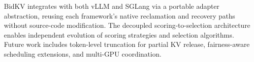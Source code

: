 \documentclass[sigconf,nonacm]{acmart}
\newcommand{\bidkv}{BidKV\xspace}
\begin{document}
\bidkv integrates with both vLLM and SGLang via a portable adapter
abstraction, reusing each framework's native reclamation and recovery paths
without source-code modification.  The decoupled scoring-to-selection architecture enables
independent evolution of scoring strategies and selection algorithms.  Future
work includes token-level truncation for partial KV release, fairness-aware
scheduling extensions, and multi-GPU coordination.



\end{document}
